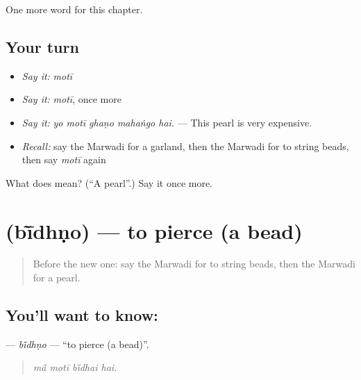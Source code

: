 \begin{grammarlens}[title={What you've built}]
One more word for this chapter.
\end{grammarlens}

\subsection*{Your turn}
\begin{itemize}
\raggedright
  \item \emph{Say it:} \emph{motī}
  \item \emph{Say it:} \emph{motī}, once more
  \item \emph{Say it:} \emph{yo motī ghaṇo mahaṅgo hai.} — This pearl is very expensive.
  \item \emph{Recall:} say the Marwadi for a garland, then the Marwadi for to string beads, then say \emph{motī} again
\end{itemize}

\begin{tcolorbox}[breakable,colback=teal!4,colframe=teal!35!black,title={Before you move on}]
What does  mean? (\textquotedblleft{}A pearl\textquotedblright{}.) Say it once more.
\end{tcolorbox}
\section[\texorpdfstring{\mw{बींधणो} (bī̃dhṇo)}{बींधणो (bī̃dhṇo)}]{ (bī̃dhṇo) — to pierce (a bead)}

\label{lesson:MW-C283-bidhno}



\begin{quote}
Before the new one: say the Marwadi for to string beads, then the Marwadi for a pearl.
\end{quote}

\subsection*{You'll want to know: }
\textbf{} — \emph{bī̃dhṇo} — \textquotedblleft{}to pierce (a bead)\textquotedblright{}.

\begin{quote}
   
\end{quote}

\begin{quote}
\emph{mā̃ motī bī̃dhai hai.}
\end{quote}

